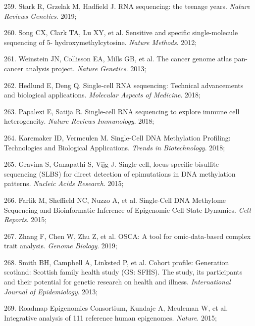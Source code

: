 \documentclass[11pt,twoside]{bristolthesis}
\newenvironment{cslreferences}%
  {}%
  {\par}
\begin{document}
\begin{cslreferences}
\leavevmode\hypertarget{ref-Stark2019}{}%
259. Stark R, Grzelak M, Hadfield J. RNA sequencing: the teenage years. \emph{Nature Reviews Genetics}. 2019;

\leavevmode\hypertarget{ref-Song2012}{}%
260. Song CX, Clark TA, Lu XY, et al. Sensitive and specific single-molecule sequencing of 5- hydroxymethylcytosine. \emph{Nature Methods}. 2012;

\leavevmode\hypertarget{ref-Weinstein2013}{}%
261. Weinstein JN, Collisson EA, Mills GB, et al. The cancer genome atlas pan-cancer analysis project. \emph{Nature Genetics}. 2013;

\leavevmode\hypertarget{ref-Hedlund2018}{}%
262. Hedlund E, Deng Q. Single-cell RNA sequencing: Technical advancements and biological applications. \emph{Molecular Aspects of Medicine}. 2018;

\leavevmode\hypertarget{ref-Papalexi2018}{}%
263. Papalexi E, Satija R. Single-cell RNA sequencing to explore immune cell heterogeneity. \emph{Nature Reviews Immunology}. 2018;

\leavevmode\hypertarget{ref-Karemaker2018}{}%
264. Karemaker ID, Vermeulen M. Single-Cell DNA Methylation Profiling: Technologies and Biological Applications. \emph{Trends in Biotechnology}. 2018;

\leavevmode\hypertarget{ref-Gravina2015}{}%
265. Gravina S, Ganapathi S, Vijg J. Single-cell, locus-specific bisulfite sequencing (SLBS) for direct detection of epimutations in DNA methylation patterns. \emph{Nucleic Acids Research}. 2015;

\leavevmode\hypertarget{ref-Farlik2015}{}%
266. Farlik M, Sheffield NC, Nuzzo A, et al. Single-Cell DNA Methylome Sequencing and Bioinformatic Inference of Epigenomic Cell-State Dynamics. \emph{Cell Reports}. 2015;

\leavevmode\hypertarget{ref-Zhang2019}{}%
267. Zhang F, Chen W, Zhu Z, et al. OSCA: A tool for omic-data-based complex trait analysis. \emph{Genome Biology}. 2019;

\leavevmode\hypertarget{ref-Smith2013}{}%
268. Smith BH, Campbell A, Linksted P, et al. Cohort profile: Generation scotland: Scottish family health study (GS: SFHS). The study, its participants and their potential for genetic research on health and illness. \emph{International Journal of Epidemiology}. 2013;

\leavevmode\hypertarget{ref-RoadmapEpigenomicsConsortium2015}{}%
269. Roadmap Epigenomics Consortium, Kundaje A, Meuleman W, et al. Integrative analysis of 111 reference human epigenomes. \emph{Nature}. 2015;


\end{cslreferences}
\end{document}
